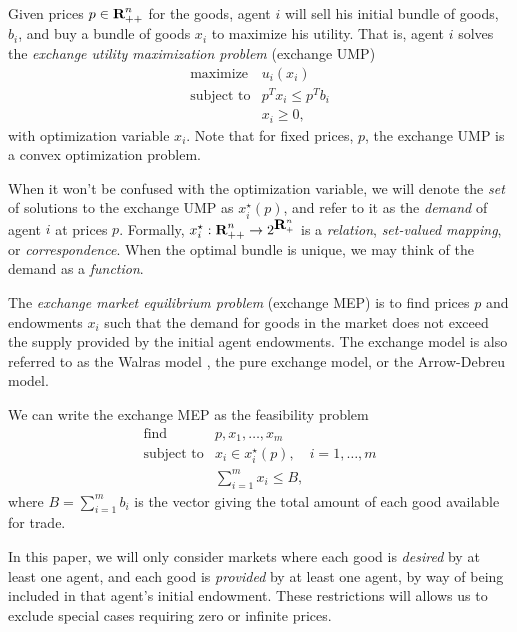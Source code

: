 \documentclass[12pt]{article}
\begin{document}
Given prices $p \in {\mbox{\bf R}}^n_{++}$ for the goods, agent $i$ will sell his
initial bundle of goods, $b_i$, and buy a bundle of goods
$x_i$ to maximize his utility.
That is, agent $i$ solves the \emph{exchange utility maximization problem} (exchange UMP)
\begin{equation}
\label{p-ump}
\begin{array}{ll}
\mbox{maximize} & u_i(x_i) \\
\mbox{subject to} & p^T x_i \leq p^T b_i \\
& x_i \geq 0,
\end{array}
\end{equation}
with optimization variable $x_i$. Note that for fixed prices, $p$, the exchange UMP is a convex optimization problem.

When it won't be confused with the optimization variable,
we will denote the \emph{set} of solutions to the exchange UMP as $x^\star_i(p)$,
and refer to it as the \emph{demand} of agent $i$ at prices $p$.
Formally, $x_i^\star : {\mbox{\bf R}}^n_{++} \to 2^{{\mbox{\bf R}}^n_+}$ is a
\emph{relation}, \emph{set-valued mapping}, or \emph{correspondence}.
When the optimal bundle is unique, we may think of
the demand as a \emph{function}.

The \emph{exchange market equilibrium problem} (exchange MEP) is to find prices $p$ and endowments $x_i$
such that the demand for goods in the market does not exceed the supply
provided by the initial agent endowments.
The exchange model is also referred to as the Walras model \cite{walras1896elements},
the pure exchange model, or the Arrow-Debreu model.

We can write the exchange MEP as the feasibility problem
\begin{equation}
\label{p-mep}
\begin{array}{ll}
\mbox{find} & p, x_1, \ldots, x_m \\
\mbox{subject to} & x_i \in x_i^\star(p),\quad i = 1,\ldots, m \\
& \sum_{i=1}^m x_i \leq B,
\end{array}
\end{equation}
where $B = \sum_{i=1}^m b_i$ is the vector giving the total amount of each good
available for trade.

In this paper, we will only consider markets where each good is \emph{desired} by at least one agent, and each good is \emph{provided} by at least one agent, by way of being included in that agent's initial endowment.
These restrictions will allows us to exclude special cases requiring zero or infinite
prices.
\end{document}
